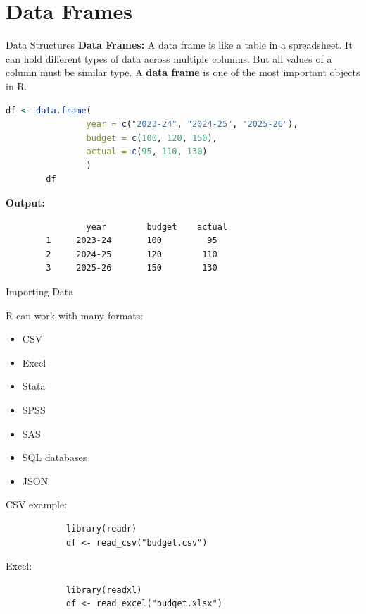 \documentclass[aspectratio=169,11pt]{beamer}
\begin{document}
	\section{Data Frames}
	
	\begin{frame}[fragile]{Data Structures}
		\textbf{Data Frames:} A data frame is like a table in a spreadsheet. It can hold different types of data across multiple columns. But all values of a column must be similar type. A \textbf{data frame} is one of the most important objects in R.
		
	
	\begin{lstlisting}[language=R]
		df <- data.frame(
				year = c("2023-24", "2024-25", "2025-26"),
				budget = c(100, 120, 150),
				actual = c(95, 110, 130)
				)
		df
	\end{lstlisting}
	
	\vspace{0.2cm}
	
	\textbf{Output:}
	
	\begin{verbatim}
		    	year     	budget    actual
		1     2023-24      	100         95
		2     2024-25      	120        110
		3     2025-26      	150        130
	\end{verbatim}
		
	\end{frame}
	
	
	\begin{frame}[fragile]{Importing Data}
		
		R can work with many formats:
		
		\begin{itemize}
			\item CSV
			\item Excel
			\item Stata
			\item SPSS
			\item SAS
			\item SQL databases
			\item JSON
		\end{itemize}
		
		CSV example:
		
		\begin{lstlisting}
			library(readr)
			df <- read_csv("budget.csv")
		\end{lstlisting}
		
		Excel:
		
		\begin{lstlisting}
			library(readxl)
			df <- read_excel("budget.xlsx")
		\end{lstlisting}
		
	\end{frame}
	
\end{document}
